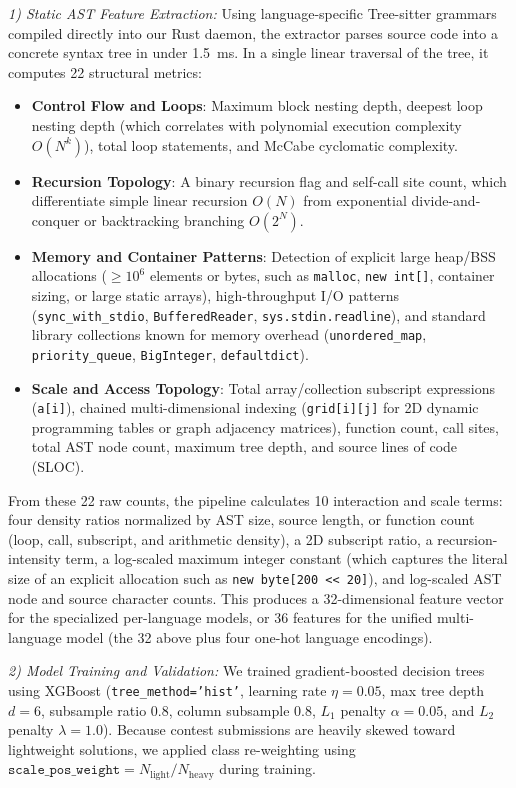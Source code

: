 \documentclass[conference]{IEEEtran}
\begin{document}
\textit{1) Static AST Feature Extraction:} Using language-specific Tree-sitter grammars compiled directly into our Rust daemon, the extractor parses source code into a concrete syntax tree in under 1.5~ms. In a single linear traversal of the tree, it computes 22 structural metrics:
\begin{itemize}
    \item \textbf{Control Flow and Loops}: Maximum block nesting depth, deepest loop nesting depth (which correlates with polynomial execution complexity $O(N^k)$), total loop statements, and McCabe cyclomatic complexity.
    \item \textbf{Recursion Topology}: A binary recursion flag and self-call site count, which differentiate simple linear recursion $O(N)$ from exponential divide-and-conquer or backtracking branching $O(2^N)$.
    \item \textbf{Memory and Container Patterns}: Detection of explicit large heap/BSS allocations ($\ge 10^6$ elements or bytes, such as \texttt{malloc}, \texttt{new int[]}, container sizing, or large static arrays), high-throughput I/O patterns (\texttt{sync\_with\_stdio}, \texttt{BufferedReader}, \texttt{sys.stdin.readline}), and standard library collections known for memory overhead (\texttt{unordered\_map}, \texttt{priority\_queue}, \texttt{BigInteger}, \texttt{defaultdict}).
    \item \textbf{Scale and Access Topology}: Total array/collection subscript expressions (\texttt{a[i]}), chained multi-dimensional indexing (\texttt{grid[i][j]} for 2D dynamic programming tables or graph adjacency matrices), function count, call sites, total AST node count, maximum tree depth, and source lines of code (SLOC).
\end{itemize}
From these 22 raw counts, the pipeline calculates 10 interaction and scale terms: four density ratios normalized by AST size, source length, or function count (loop, call, subscript, and arithmetic density), a 2D subscript ratio, a recursion-intensity term, a log-scaled maximum integer constant (which captures the literal size of an explicit allocation such as \texttt{new byte[200 << 20]}), and log-scaled AST node and source character counts. This produces a 32-dimensional feature vector for the specialized per-language models, or 36 features for the unified multi-language model (the 32 above plus four one-hot language encodings).

\textit{2) Model Training and Validation:}
We trained gradient-boosted decision trees using XGBoost (\texttt{tree\_method='hist'}, learning rate $\eta = 0.05$, max tree depth $d = 6$, subsample ratio $0.8$, column subsample $0.8$, $L_1$ penalty $\alpha = 0.05$, and $L_2$ penalty $\lambda = 1.0$). Because contest submissions are heavily skewed toward lightweight solutions, we applied class re-weighting using $\texttt{scale\_pos\_weight} = N_{\mathrm{light}} / N_{\mathrm{heavy}}$ during training.
\end{document}
